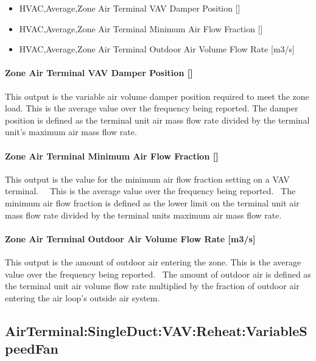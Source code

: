 \begin{itemize}
\item
  HVAC,Average,Zone Air Terminal VAV Damper Position {[]}
\item
  HVAC,Average,Zone Air Terminal Minimum Air Flow Fraction {[]}
\item
  HVAC,Average,Zone Air Terminal Outdoor Air Volume Flow Rate {[}m3/s{]}
\end{itemize}

\paragraph{Zone Air Terminal VAV Damper Position {[]}}\label{zone-air-terminal-vav-damper-position}

This output is the variable air volume damper position required to meet the zone load. This is the average value over the frequency being reported. The damper position is defined as the terminal unit air mass flow rate divided by the terminal unit's maximum air mass flow rate.

\paragraph{Zone Air Terminal Minimum Air Flow Fraction {[]}}\label{zone-air-terminal-minimum-air-flow-fraction}

This output is the value for the minimum air flow fraction setting on a VAV terminal.~~ This is the average value over the frequency being reported.~ The minimum air flow fraction is defined as the lower limit on the terminal unit air mass flow rate divided by the terminal units maximum air mass flow rate.

\paragraph{Zone Air Terminal Outdoor Air Volume Flow Rate {[}m3/s{]}}\label{zone-air-terminal-outdoor-air-volume-flow-rate-m3s}

This output is the amount of outdoor air entering the zone. This is the average value over the frequency being reported.~ The amount of outdoor air is defined as the terminal unit air volume flow rate multiplied by the fraction of outdoor air entering the air loop's outside air system.

\subsection{AirTerminal:SingleDuct:VAV:Reheat:VariableSpeedFan}\label{airterminalsingleductvavreheatvariablespeedfan}

